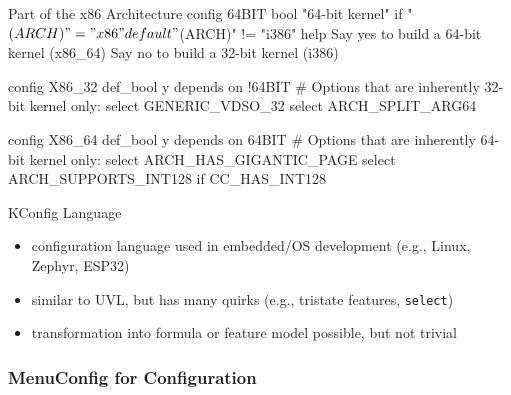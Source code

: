 \begin{frame}[fragile]{\myframetitle}
	\begin{fancycolumns}
		\begin{kconfigtight}[basicstyle=\small]{Part of the x86 Architecture }
config 64BIT
	bool "64-bit kernel" if "$(ARCH)" = "x86"
	default "$(ARCH)" != "i386"
	help
		Say yes to build a 64-bit kernel (x86_64)
		Say no to build a 32-bit kernel (i386)

config X86_32
	def_bool y
	depends on !64BIT
	# Options that are inherently 32-bit kernel only:
	select GENERIC_VDSO_32
	select ARCH_SPLIT_ARG64

config X86_64
	def_bool y
	depends on 64BIT
	# Options that are inherently 64-bit kernel only:
	select ARCH_HAS_GIGANTIC_PAGE
	select ARCH_SUPPORTS_INT128 if CC_HAS_INT128
\end{kconfigtight}
	\nextcolumn
		\begin{definition}{KConfig Language}
			\begin{itemize}
				\item configuration language used in embedded/OS development (e.g., Linux, Zephyr, ESP32)
				\item similar to UVL, but has many quirks (e.g., tristate features, \texttt{select})
				\item transformation into formula or feature model possible, but not trivial 
			\end{itemize}
		\end{definition}
		\hspace*{-0.07253886\linewidth}%
	\end{fancycolumns}
\end{frame}

\subsubsection*{MenuConfig for Configuration}

